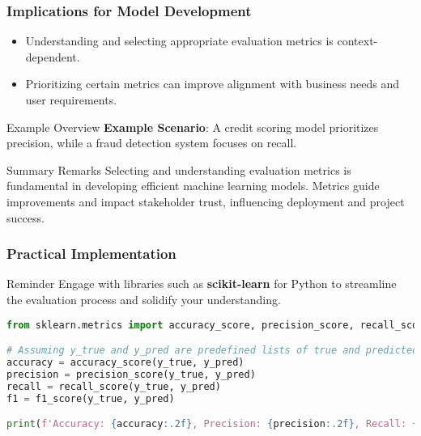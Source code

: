 \documentclass[aspectratio=169]{beamer}
\begin{document}
\begin{frame}[fragile]
    \frametitle{Implications for Model Development}
    \begin{itemize}
        \item Understanding and selecting appropriate evaluation metrics is context-dependent.
        \item Prioritizing certain metrics can improve alignment with business needs and user requirements.
    \end{itemize}

    \begin{block}{Example Overview}
        \textbf{Example Scenario}: A credit scoring model prioritizes precision, while a fraud detection system focuses on recall.
    \end{block}

    \begin{block}{Summary Remarks}
        Selecting and understanding evaluation metrics is fundamental in developing efficient machine learning models.
        Metrics guide improvements and impact stakeholder trust, influencing deployment and project success.
    \end{block}
\end{frame}

\begin{frame}[fragile]
    \frametitle{Practical Implementation}
    \begin{block}{Reminder}
        Engage with libraries such as \textbf{scikit-learn} for Python to streamline the evaluation process and solidify your understanding.
    \end{block}

    \begin{lstlisting}[language=Python]
from sklearn.metrics import accuracy_score, precision_score, recall_score, f1_score

# Assuming y_true and y_pred are predefined lists of true and predicted values
accuracy = accuracy_score(y_true, y_pred)
precision = precision_score(y_true, y_pred)
recall = recall_score(y_true, y_pred)
f1 = f1_score(y_true, y_pred)

print(f'Accuracy: {accuracy:.2f}, Precision: {precision:.2f}, Recall: {recall:.2f}, F1 Score: {f1:.2f}')
    \end{lstlisting}
\end{frame}
\end{document}

